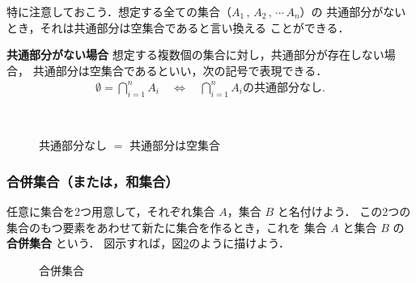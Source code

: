                     特に注意しておこう．想定する全ての集合（$A_{1}\,,\,A_{2}\,,\,\cdots\,A_{n}$）の
                    共通部分がないとき，それは共通部分は空集合であると言い換える
                    ことができる．
                    \\
                    \begin{itembox}[l]{\textbf{共通部分がない場合}}
                        想定する複数個の集合に対し，共通部分が存在しない場合，
                        共通部分は空集合であるといい，次の記号で表現できる．
                        \begin{align}
                           \emptyset = \bigcap_{i=1}^{n} A_{i}
                           \quad
                           \Longleftrightarrow
                           \quad
                           \bigcap_{i=1}^{n} A_{i} \mbox{の共通部分なし}.
                        \end{align}
                    \end{itembox}
                    \\

                        \begin{figure}[hbt]
                            \begin{center}
                                \caption{共通部分なし $=$ 共通部分は空集合}
                                \label{fig:kyoutububun2_phi}
                            \end{center}
                        \end{figure}


                \subsubsection{合併集合（または，和集合）}
                    任意に集合を2つ用意して，それぞれ集合 $A$，集合 $B$ と名付けよう．
                    この2つの集合のもつ要素をあわせて新たに集合を作るとき，これを
                    集合 $A$ と集合 $B$ の \textbf{合併集合} という．
                    図示すれば，図\ref{fig:gappei_shugo1}のように描けよう．
                        \begin{figure}[hbt]
                            \begin{center}
                                \caption{合併集合}
                                \label{fig:gappei_shugo1}
                            \end{center}
                        \end{figure}

